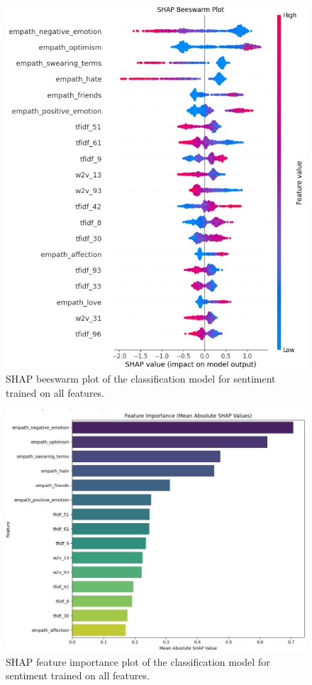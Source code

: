 \begin{center}
\begin{figure}[H]
  \centering
  \includegraphics[width=5in]{img/beeswarm_sentiment.png}
  \caption{SHAP beeswarm plot of the classification model for sentiment
  trained on all features.}
  \label{Figure:fig_bh}
\end{figure}
\end{center}

\begin{center}
\begin{figure}[H]
  \centering
  \includegraphics[width=5in]{img/feature_importance_sentiment.png}
  \caption{SHAP feature importance plot of the classification model for
  sentiment trained on all features.}
  \label{Figure:fig_eh}
\end{figure}
\end{center}

